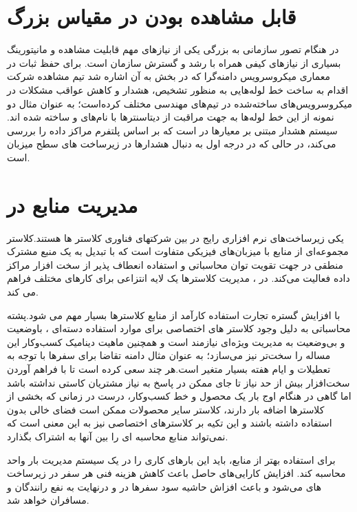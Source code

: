 \section{قابل مشاهده بودن در مقیاس بزرگ} 
در هنگام تصور سازمانی به بزرگی  یکی از نیاز‌های مهم قابلیت مشاهده و مانیتورینگ بسیاری از نیاز‌های کیفی همراه با رشد و گسترش سازمان است. برای حفظ ثبات در معماری میکروسرویس دامنه‌گرا که در بخش \cite{domainmicroservice} به آن اشاره شد تیم مشاهده شرکت  اقدام به ساخت خط لوله‌هایی به منظور تشخیص، هشدار و کاهش عواقب مشکلات در میکروسرویس‌های ساخته‌شده در تیم‌های مهندسی مختلف کرده‌است؛ به عنوان مثال دو نمونه از این خط لوله‌ها به جهت مراقبت از دیتاسنتر‌ها با نام‌های  و  ساخته شده اند. سیستم هشدار مبتنی بر معیار‌ها در  است که بر اساس پلتفرم  \cite{m3_uber} مراکز داده را بررسی می‌کند، در حالی که  در درجه اول به دنبال هشدارها در زیرساخت های سطح میزبان است.

\section{مدیریت منابع در }
یکی زیرساخت‌های نرم افزاری رایج در بین شرکتهای فناوری کلاستر ها هستند.کلاستر مجموعه‌ای از منابع با میزبان‌های فیزیکی متفاوت است که با تبدیل به یک منبع مشترک منطقی در جهت تقویت توان محاسباتی و استفاده انعطاف پذیر از سخت افزار مراکز داده فعالیت می‌کند. در ، مدیریت کلاسترها یک لایه انتزاعی برای کارهای مختلف فراهم می کند\cite{resource_uber}.

با افزایش گستره تجارت  استفاده کارآمد از منابع کلاستر‌ها بسیار مهم می شود.پشته محاسباتی  به دلیل وجود کلاستر های اختصاصی برای موارد استفاده دسته‌ای ، باوضعیت و بی‌وضعیت به مدیریت ویژه‌ای نیازمند است و همچنین ماهیت دینامیک کسب‌و‌کار  این مساله را سخت‌تر نیز می‌سازد؛ به عنوان مثال دامنه تقاضا برای سفرها با توجه به تعطیلات و ایام هفته بسیار متغیر است.هر چند  سعی کرده است تا با فراهم آوردن سخت‌افزار بیش از حد نیاز تا جای ممکن در پاسخ به نیاز مشتریان کاستی نداشته باشد اما گاهی در هنگام اوج بار یک محصول و خط کسب‌و‌کار، درست در زمانی که بخشی از کلاستر‌ها اضافه بار دارند، کلاستر سایر محصولات ممکن است فضای خالی بدون استفاده داشته باشند و این تکیه بر کلاستر‌های اختصاصی نیز به این معنی است که  نمی‌تواند منابع محاسبه ای را بین آنها به اشتراک بگذارد.


برای استفاده بهتر از منابع، باید این بارهای کاری را در یک سیستم مدیریت بار واحد محاسبه کند. افزایش کارایی‌های حاصل باعث کاهش هزینه فنی هر سفر در زیرساخت های  می‌شود و باعث افزاش حاشیه سود سفر‌ها در  و درنهایت به نفع رانندگان و مسافران خواهد شد.

